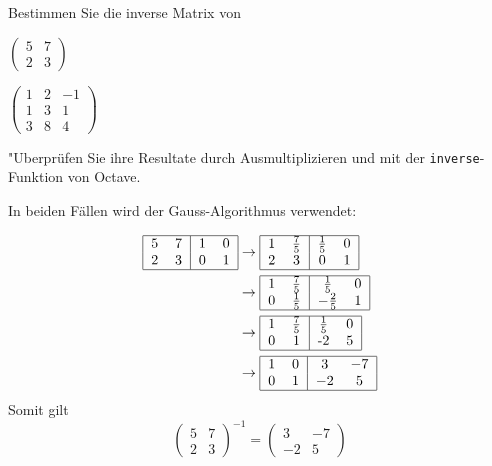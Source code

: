 Bestimmen Sie die inverse Matrix von
\begin{teilaufgaben}
\item
$
\begin{pmatrix}
5&7\\
2&3
\end{pmatrix}
$
\item
$
\begin{pmatrix}
1&2&-1\\
1&3&1\\
3&8&4
\end{pmatrix}
$
\end{teilaufgaben}
"Uberprüfen Sie ihre Resultate durch Ausmultiplizieren und mit der
{\tt inverse}-Funktion von Octave.


\begin{loesung}
In beiden Fällen wird der Gauss-Algorithmus verwendet:
\begin{teilaufgaben}
\item
\begin{align*}
\begin{tabular}{|cc|cc|}
\hline
5&7&1&0\\
2&3&0&1\\
\hline
\end{tabular}
&
\rightarrow
\begin{tabular}{|cc|cc|}
\hline
1&$\frac75$&$\frac15$&0\\
2&3&0&1\\
\hline
\end{tabular}
\\
&
\rightarrow
\begin{tabular}{|cc|cc|}
\hline
1&$\frac75$&$\frac15$&0\\
0&$\frac15$&$-\frac25$&1\\
\hline
\end{tabular}
\\
&
\rightarrow
\begin{tabular}{|cc|cc|}
\hline
1&$\frac75$&$\frac15$&0\\
0&1&-2&5\\
\hline
\end{tabular}
\\
&
\rightarrow
\begin{tabular}{|cc|cc|}
\hline
1&0&3&$-7$\\
0&1&$-2$&5\\
\hline
\end{tabular}
\end{align*}
Somit gilt
\[
\begin{pmatrix}
5&7\\
2&3
\end{pmatrix}^{-1}=
\begin{pmatrix}
3&-7\\-2&5
\end{pmatrix}
\]


\end{teilaufgaben}
\end{loesung}
